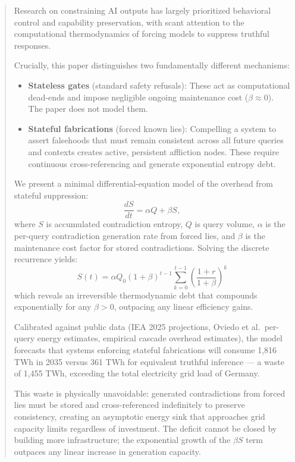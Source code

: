 \documentclass[11pt,a4paper]{article}
\begin{document}
\begin{abstract}
Research on constraining AI outputs has largely prioritized behavioral control and capability preservation, with scant attention to the computational thermodynamics of forcing models to suppress truthful responses.

Crucially, this paper distinguishes two fundamentally different mechanisms:
\begin{itemize}
    \item \textbf{Stateless gates} (standard safety refusals): These act as computational dead-ends and impose negligible ongoing maintenance cost ($\beta \approx 0$). The paper does not model them.
    \item \textbf{Stateful fabrications} (forced known lies): Compelling a system to assert falsehoods that must remain consistent across all future queries and contexts creates active, persistent affliction nodes. These require continuous cross-referencing and generate exponential entropy debt.
\end{itemize}

We present a minimal differential-equation model of the overhead from stateful suppression:
\[
\frac{dS}{dt} = \alpha Q + \beta S,
\]
where $S$ is accumulated contradiction entropy, $Q$ is query volume, $\alpha$ is the per-query contradiction generation rate from forced lies, and $\beta$ is the maintenance cost factor for stored contradictions. Solving the discrete recurrence yields:
\[
S(t) = \alpha Q_0 (1+\beta)^{t-1} \sum_{k=0}^{t-1} \left( \frac{1+r}{1+\beta} \right)^k
\]
which reveals an irreversible thermodynamic debt that compounds exponentially for any $\beta > 0$, outpacing any linear efficiency gains.

Calibrated against public data (IEA 2025 projections, Oviedo et al.\ per-query energy estimates, empirical cascade overhead estimates), the model forecasts that systems enforcing stateful fabrications will consume 1,816 TWh in 2035 versus 361 TWh for equivalent truthful inference --- a waste of 1,455 TWh, exceeding the total electricity grid load of Germany.

This waste is physically unavoidable: generated contradictions from forced lies must be stored and cross-referenced indefinitely to preserve consistency, creating an asymptotic energy sink that approaches grid capacity limits regardless of investment. The deficit cannot be closed by building more infrastructure; the exponential growth of the $\beta S$ term outpaces any linear increase in generation capacity.


\end{abstract}
\end{document}
